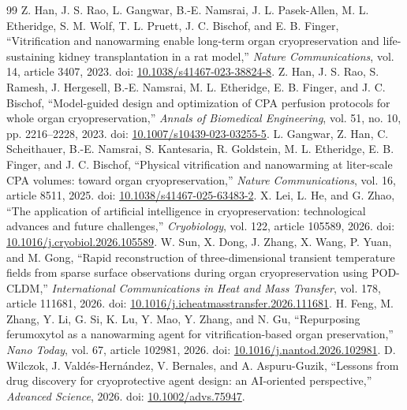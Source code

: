 \documentclass[11pt]{article}
\begin{document}
\begin{thebibliography}{99}
 Z. Han, J. S. Rao, L. Gangwar, B.-E. Namsrai, J. L. Pasek-Allen, M. L. Etheridge, S. M. Wolf, T. L. Pruett, J. C. Bischof, and E. B. Finger, ``Vitrification and nanowarming enable long-term organ cryopreservation and life-sustaining kidney transplantation in a rat model,'' \emph{Nature Communications}, vol. 14, article 3407, 2023. doi: \href{https://doi.org/10.1038/s41467-023-38824-8}{10.1038/s41467-023-38824-8}.
 Z. Han, J. S. Rao, S. Ramesh, J. Hergesell, B.-E. Namsrai, M. L. Etheridge, E. B. Finger, and J. C. Bischof, ``Model-guided design and optimization of CPA perfusion protocols for whole organ cryopreservation,'' \emph{Annals of Biomedical Engineering}, vol. 51, no. 10, pp. 2216--2228, 2023. doi: \href{https://doi.org/10.1007/s10439-023-03255-5}{10.1007/s10439-023-03255-5}.
 L. Gangwar, Z. Han, C. Scheithauer, B.-E. Namsrai, S. Kantesaria, R. Goldstein, M. L. Etheridge, E. B. Finger, and J. C. Bischof, ``Physical vitrification and nanowarming at liter-scale CPA volumes: toward organ cryopreservation,'' \emph{Nature Communications}, vol. 16, article 8511, 2025. doi: \href{https://doi.org/10.1038/s41467-025-63483-2}{10.1038/s41467-025-63483-2}.
 X. Lei, L. He, and G. Zhao, ``The application of artificial intelligence in cryopreservation: technological advances and future challenges,'' \emph{Cryobiology}, vol. 122, article 105589, 2026. doi: \href{https://doi.org/10.1016/j.cryobiol.2026.105589}{10.1016/j.cryobiol.2026.105589}.
 W. Sun, X. Dong, J. Zhang, X. Wang, P. Yuan, and M. Gong, ``Rapid reconstruction of three-dimensional transient temperature fields from sparse surface observations during organ cryopreservation using POD-CLDM,'' \emph{International Communications in Heat and Mass Transfer}, vol. 178, article 111681, 2026. doi: \href{https://doi.org/10.1016/j.icheatmasstransfer.2026.111681}{10.1016/j.icheatmasstransfer.2026.111681}.
 H. Feng, M. Zhang, Y. Li, G. Si, K. Lu, Y. Mao, Y. Zhang, and N. Gu, ``Repurposing ferumoxytol as a nanowarming agent for vitrification-based organ preservation,'' \emph{Nano Today}, vol. 67, article 102981, 2026. doi: \href{https://doi.org/10.1016/j.nantod.2026.102981}{10.1016/j.nantod.2026.102981}.
 D. Wilczok, J. Vald{\'e}s-Hern{\'a}ndez, V. Bernales, and A. Aspuru-Guzik, ``Lessons from drug discovery for cryoprotective agent design: an AI-oriented perspective,'' \emph{Advanced Science}, 2026. doi: \href{https://doi.org/10.1002/advs.75947}{10.1002/advs.75947}.
\end{thebibliography}
\end{document}

